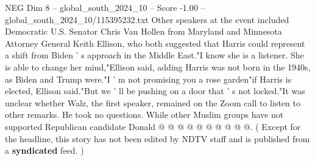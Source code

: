 \begin{textsample}{NEG Dim 8 – global\_south\_2024\_10 – Score -1.00 – global\_south\_2024\_10/115395232.txt}
Other speakers at the event included Democratic U.S.
Senator Chris Van Hollen from Maryland and Minnesota Attorney General Keith Ellison, who both suggested that Harris could represent a shift from Biden ' s approach in the Middle East."I know she is a listener.
She is able to change her mind,"Ellison said, adding Harris was not born in the 1940s, as Biden and Trump were."I ' m not promising you a rose garden"if Harris is elected, Ellison said."But we ' ll be pushing on a door that ' s not locked."It was unclear whether Walz, the first speaker, remained on the Zoom call to listen to other remarks.
He took no questions.
While other Muslim groups have not supported Republican candidate Donald @ @ @ @ @ @ @ @ @ @. ( Except for the headline, this story has not been edited by NDTV staff and is published from a \textbf{syndicated} feed. )

\end{textsample}
